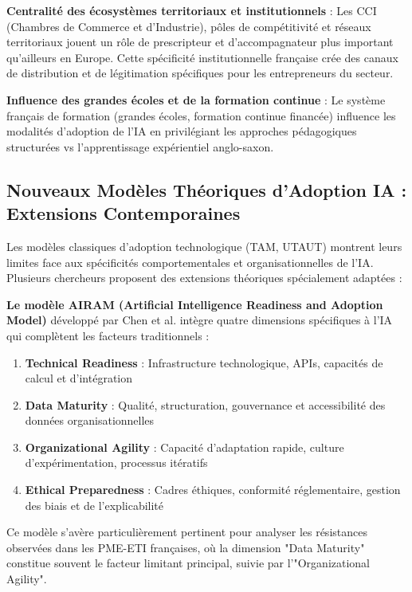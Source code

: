\textbf{Centralité des écosystèmes territoriaux et institutionnels} : Les CCI (Chambres de Commerce et d'Industrie), pôles de compétitivité et réseaux territoriaux jouent un rôle de prescripteur et d'accompagnateur plus important qu'ailleurs en Europe. Cette spécificité institutionnelle française crée des canaux de distribution et de légitimation spécifiques pour les entrepreneurs du secteur.

\textbf{Influence des grandes écoles et de la formation continue} : Le système français de formation (grandes écoles, formation continue financée) influence les modalités d'adoption de l'IA en privilégiant les approches pédagogiques structurées vs l'apprentissage expérientiel anglo-saxon.

\subsection{Nouveaux Modèles Théoriques d'Adoption IA : Extensions Contemporaines}

Les modèles classiques d'adoption technologique (TAM, UTAUT) montrent leurs limites face aux spécificités comportementales et organisationnelles de l'IA. Plusieurs chercheurs proposent des extensions théoriques spécialement adaptées :

\textbf{Le modèle AIRAM (Artificial Intelligence Readiness and Adoption Model)} développé par Chen et al. \cite{chen2024airam} intègre quatre dimensions spécifiques à l'IA qui complètent les facteurs traditionnels :

\begin{enumerate}
    \item \textbf{Technical Readiness} : Infrastructure technologique, APIs, capacités de calcul et d'intégration
    \item \textbf{Data Maturity} : Qualité, structuration, gouvernance et accessibilité des données organisationnelles
    \item \textbf{Organizational Agility} : Capacité d'adaptation rapide, culture d'expérimentation, processus itératifs
    \item \textbf{Ethical Preparedness} : Cadres éthiques, conformité réglementaire, gestion des biais et de l'explicabilité
\end{enumerate}

Ce modèle s'avère particulièrement pertinent pour analyser les résistances observées dans les PME-ETI françaises, où la dimension "Data Maturity" constitue souvent le facteur limitant principal, suivie par l'"Organizational Agility".

